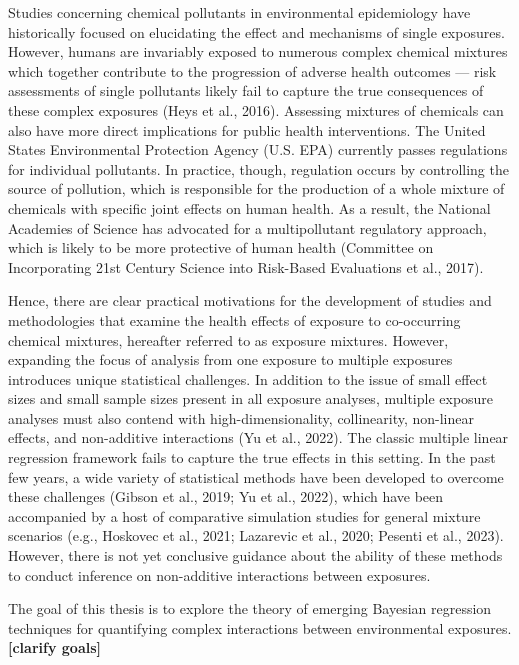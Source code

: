 \documentclass[12pt, twoside]{amherstthesis}
\begin{document}
Studies concerning chemical pollutants in environmental epidemiology have historically focused on elucidating the effect and mechanisms of single exposures. However, humans are invariably exposed to numerous complex chemical mixtures which together contribute to the progression of adverse health outcomes --- risk assessments of single pollutants likely fail to capture the true consequences of these complex exposures (Heys et al., 2016). Assessing mixtures of chemicals can also have more direct implications for public health interventions. The United States Environmental Protection Agency (U.S. EPA) currently passes regulations for individual pollutants. In practice, though, regulation occurs by controlling the source of pollution, which is responsible for the production of a whole mixture of chemicals with specific joint effects on human health. As a result, the National Academies of Science has advocated for a multipollutant regulatory approach, which is likely to be more protective of human health (Committee on Incorporating 21st Century Science into Risk-Based Evaluations et al., 2017).

Hence, there are clear practical motivations for the development of studies and methodologies that examine the health effects of exposure to co-occurring chemical mixtures, hereafter referred to as exposure mixtures. However, expanding the focus of analysis from one exposure to multiple exposures introduces unique statistical challenges. In addition to the issue of small effect sizes and small sample sizes present in all exposure analyses, multiple exposure analyses must also contend with high-dimensionality, collinearity, non-linear effects, and non-additive interactions (Yu et al., 2022). The classic multiple linear regression framework fails to capture the true effects in this setting. In the past few years, a wide variety of statistical methods have been developed to overcome these challenges (Gibson et al., 2019; Yu et al., 2022), which have been accompanied by a host of comparative simulation studies for general mixture scenarios (e.g., Hoskovec et al., 2021; Lazarevic et al., 2020; Pesenti et al., 2023). However, there is not yet conclusive guidance about the ability of these methods to conduct inference on non-additive interactions between exposures.

The goal of this thesis is to explore the theory of emerging Bayesian regression techniques for quantifying complex interactions between environmental exposures. \textbf{{[}clarify goals{]}}
\end{document}

